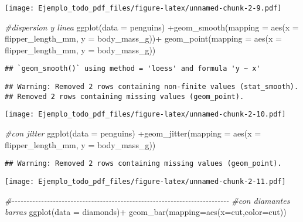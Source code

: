 \documentclass[
]{article}
\newenvironment{Shaded}{\begin{snugshade}}{\end{snugshade}}
\newcommand{\AttributeTok}[1]{\textcolor[rgb]{0.77,0.63,0.00}{#1}}
\newcommand{\CommentTok}[1]{\textcolor[rgb]{0.56,0.35,0.01}{\textit{#1}}}
\newcommand{\FunctionTok}[1]{\textcolor[rgb]{0.00,0.00,0.00}{#1}}
\newcommand{\NormalTok}[1]{#1}
\newcommand{\SpecialCharTok}[1]{\textcolor[rgb]{0.00,0.00,0.00}{#1}}
\begin{document}
\texttt{[image: Ejemplo\_todo\_pdf\_files/figure-latex/unnamed-chunk-2-9.pdf]}

\begin{Shaded}
\begin{Highlighting}[]
\CommentTok{\#dispersion y linea}
\FunctionTok{ggplot}\NormalTok{(}\AttributeTok{data =}\NormalTok{ penguins) }\SpecialCharTok{+}\FunctionTok{geom\_smooth}\NormalTok{(}\AttributeTok{mapping =} \FunctionTok{aes}\NormalTok{(}\AttributeTok{x =}\NormalTok{ flipper\_length\_mm, }\AttributeTok{y =}
\NormalTok{                                                     body\_mass\_g))}\SpecialCharTok{+}
  \FunctionTok{geom\_point}\NormalTok{(}\AttributeTok{mapping =} \FunctionTok{aes}\NormalTok{(}\AttributeTok{x =}\NormalTok{ flipper\_length\_mm, }\AttributeTok{y =}
\NormalTok{                             body\_mass\_g))}
\end{Highlighting}
\end{Shaded}

\begin{verbatim}
## `geom_smooth()` using method = 'loess' and formula 'y ~ x'
\end{verbatim}

\begin{verbatim}
## Warning: Removed 2 rows containing non-finite values (stat_smooth).
## Removed 2 rows containing missing values (geom_point).
\end{verbatim}

\texttt{[image: Ejemplo\_todo\_pdf\_files/figure-latex/unnamed-chunk-2-10.pdf]}

\begin{Shaded}
\begin{Highlighting}[]
\CommentTok{\#con jitter}
\FunctionTok{ggplot}\NormalTok{(}\AttributeTok{data =}\NormalTok{ penguins) }\SpecialCharTok{+}\FunctionTok{geom\_jitter}\NormalTok{(}\AttributeTok{mapping =} \FunctionTok{aes}\NormalTok{(}\AttributeTok{x =}\NormalTok{ flipper\_length\_mm, }\AttributeTok{y =}
\NormalTok{                                                     body\_mass\_g))}
\end{Highlighting}
\end{Shaded}

\begin{verbatim}
## Warning: Removed 2 rows containing missing values (geom_point).
\end{verbatim}

\texttt{[image: Ejemplo\_todo\_pdf\_files/figure-latex/unnamed-chunk-2-11.pdf]}

\begin{Shaded}
\begin{Highlighting}[]
\CommentTok{\#{-}{-}{-}{-}{-}{-}{-}{-}{-}{-}{-}{-}{-}{-}{-}{-}{-}{-}{-}{-}{-}{-}{-}{-}{-}{-}{-}{-}{-}{-}{-}{-}{-}{-}{-}{-}{-}{-}{-}{-}{-}{-}{-}{-}{-}{-}{-}{-}{-}{-}{-}{-}{-}{-}{-}{-}{-}{-}{-}{-}{-}{-}{-}{-}{-}{-}{-}{-}{-}{-}{-}{-}{-}{-}}
\CommentTok{\#con diamantes barras}
\FunctionTok{ggplot}\NormalTok{(}\AttributeTok{data =}\NormalTok{ diamonds)}\SpecialCharTok{+}
  \FunctionTok{geom\_bar}\NormalTok{(}\AttributeTok{mapping=}\FunctionTok{aes}\NormalTok{(}\AttributeTok{x=}\NormalTok{cut,}\AttributeTok{color=}\NormalTok{cut))}
\end{Highlighting}
\end{Shaded}
\end{document}
